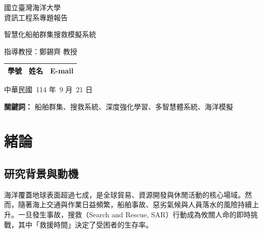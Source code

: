 \documentclass[12pt,a4paper]{article}
\begin{document}
\begin{titlepage}

	\centering
	\vspace*{2cm}
	
	{\Large 國立臺灣海洋大學\\[0.5cm]資訊工程系專題報告 \par}
	
	\vspace*{1cm}
	{\Huge 智慧化船舶群集搜救模擬系統 \par}
	
	\vfill
	
	{\Large 指導教授：鄭錫齊 教授 \par}
	\vspace*{1cm}
	\begin{tabular}{lll}
	學號 & 姓名 & E-mail \\
	\hline
	\end{tabular}

	\vspace*{1cm}
	{\Large 中華民國\ 114 年\ 9 月\ 21 日 \par}

\end{titlepage}

\vspace*{0.3\textheight}
\begin{abstract}
海上搜救任務面臨著範圍廣闊、海象險惡、時間緊迫等嚴峻挑戰。為應對此一難題，本專案建構了一套「智慧化船舶群集搜救模擬系統」。系統核心旨在模擬並最佳化真實的搜救作業流程：首先，依據目標可能區域進行高效的網格化分割；接著，指揮調度多艘船隻構成的搜救群集，對各區塊展開平行搜索，以最大化覆蓋率並縮短搜尋時間。我們在 Unity 與 Crest 物理引擎打造的擬真海洋環境中，採用 SAC 深度強化學習演算法，賦予每艘搜救船隻在複雜風浪中自主執行精密搜索路徑、並規避動態障礙物的能力。本專案旨在評估此 AI 驅動的搜救群集，在不同搜救情境下，對於提升目標發現成功率、縮短搜救時間的實際成效，為未來智慧化海上應急響應系統提供關鍵的模擬驗證。
\end{abstract}

\centerline{\textbf{關鍵詞：} 船舶群集、搜救系統、深度強化學習、多智慧體系統、海洋模擬}

\newpage

\tableofcontents
\newpage

\section{緒論}

\subsection{研究背景與動機}
海洋覆蓋地球表面超過七成，是全球貿易、資源開發與休閒活動的核心場域。然而，隨著海上交通與作業日益頻繁，船舶事故、惡劣氣候與人員落水的風險持續上升。一旦發生事故，搜救（Search and Rescue, SAR）行動成為攸關人命的即時挑戰，其中「救援時間」決定了受困者的生存率。
\end{document}
